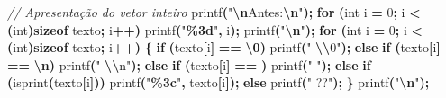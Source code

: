 \documentclass[
  11pt,
  a4paper,
]{scrbook}
\newenvironment{Shaded}{\begin{snugshade}}{\end{snugshade}}
\newcommand{\CharTok}[1]{\textcolor[rgb]{0.31,0.60,0.02}{#1}}
\newcommand{\CommentTok}[1]{\textcolor[rgb]{0.56,0.35,0.01}{\textit{#1}}}
\newcommand{\ControlFlowTok}[1]{\textcolor[rgb]{0.13,0.29,0.53}{\textbf{#1}}}
\newcommand{\DataTypeTok}[1]{\textcolor[rgb]{0.13,0.29,0.53}{#1}}
\newcommand{\DecValTok}[1]{\textcolor[rgb]{0.00,0.00,0.81}{#1}}
\newcommand{\KeywordTok}[1]{\textcolor[rgb]{0.13,0.29,0.53}{\textbf{#1}}}
\newcommand{\NormalTok}[1]{#1}
\newcommand{\OperatorTok}[1]{\textcolor[rgb]{0.81,0.36,0.00}{\textbf{#1}}}
\newcommand{\SpecialCharTok}[1]{\textcolor[rgb]{0.81,0.36,0.00}{\textbf{#1}}}
\newcommand{\StringTok}[1]{\textcolor[rgb]{0.31,0.60,0.02}{#1}}
\begin{document}
\begin{Shaded}
\begin{Highlighting}[]
    \CommentTok{// Apresentação do vetor inteiro}
\NormalTok{    printf}\OperatorTok{(}\StringTok{"}\SpecialCharTok{\textbackslash{}n}\StringTok{Antes:}\SpecialCharTok{\textbackslash{}n}\StringTok{"}\OperatorTok{);}
    \ControlFlowTok{for} \OperatorTok{(}\DataTypeTok{int}\NormalTok{ i }\OperatorTok{=} \DecValTok{0}\OperatorTok{;}\NormalTok{ i }\OperatorTok{\textless{}} \OperatorTok{(}\DataTypeTok{int}\OperatorTok{)}\KeywordTok{sizeof}\NormalTok{ texto}\OperatorTok{;}\NormalTok{ i}\OperatorTok{++)}
\NormalTok{        printf}\OperatorTok{(}\StringTok{"}\SpecialCharTok{\%3d}\StringTok{"}\OperatorTok{,}\NormalTok{ i}\OperatorTok{);}
\NormalTok{    printf}\OperatorTok{(}\StringTok{"}\SpecialCharTok{\textbackslash{}n}\StringTok{"}\OperatorTok{);}
    \ControlFlowTok{for} \OperatorTok{(}\DataTypeTok{int}\NormalTok{ i }\OperatorTok{=} \DecValTok{0}\OperatorTok{;}\NormalTok{ i }\OperatorTok{\textless{}} \OperatorTok{(}\DataTypeTok{int}\OperatorTok{)}\KeywordTok{sizeof}\NormalTok{ texto}\OperatorTok{;}\NormalTok{ i}\OperatorTok{++)} \OperatorTok{\{}
        \ControlFlowTok{if} \OperatorTok{(}\NormalTok{texto}\OperatorTok{[}\NormalTok{i}\OperatorTok{]} \OperatorTok{==} \CharTok{\textquotesingle{}}\SpecialCharTok{\textbackslash{}0}\CharTok{\textquotesingle{}}\OperatorTok{)}
\NormalTok{            printf}\OperatorTok{(}\StringTok{" }\SpecialCharTok{\textbackslash{}\textbackslash{}}\StringTok{0"}\OperatorTok{);}
        \ControlFlowTok{else} \ControlFlowTok{if} \OperatorTok{(}\NormalTok{texto}\OperatorTok{[}\NormalTok{i}\OperatorTok{]} \OperatorTok{==} \CharTok{\textquotesingle{}}\SpecialCharTok{\textbackslash{}n}\CharTok{\textquotesingle{}}\OperatorTok{)}
\NormalTok{            printf}\OperatorTok{(}\StringTok{" }\SpecialCharTok{\textbackslash{}\textbackslash{}}\StringTok{n"}\OperatorTok{);}
        \ControlFlowTok{else} \ControlFlowTok{if} \OperatorTok{(}\NormalTok{texto}\OperatorTok{[}\NormalTok{i}\OperatorTok{]} \OperatorTok{==} \CharTok{\textquotesingle{} \textquotesingle{}}\OperatorTok{)}
\NormalTok{            printf}\OperatorTok{(}\StringTok{"   "}\OperatorTok{);}
        \ControlFlowTok{else} \ControlFlowTok{if} \OperatorTok{(}\NormalTok{isprint}\OperatorTok{(}\NormalTok{texto}\OperatorTok{[}\NormalTok{i}\OperatorTok{]))}
\NormalTok{            printf}\OperatorTok{(}\StringTok{"}\SpecialCharTok{\%3c}\StringTok{"}\OperatorTok{,}\NormalTok{ texto}\OperatorTok{[}\NormalTok{i}\OperatorTok{]);}
        \ControlFlowTok{else}
\NormalTok{            printf}\OperatorTok{(}\StringTok{" ??"}\OperatorTok{);}
    \OperatorTok{\}}
\NormalTok{    printf}\OperatorTok{(}\StringTok{"}\SpecialCharTok{\textbackslash{}n}\StringTok{"}\OperatorTok{);}


\end{Highlighting}
\end{Shaded}
\end{document}
